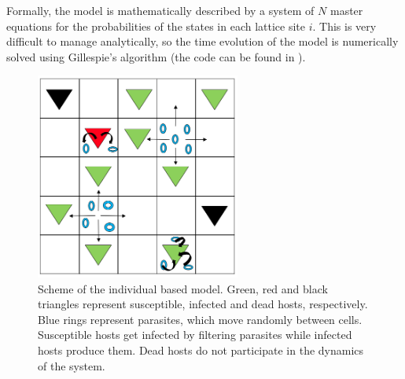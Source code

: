 Formally, the model is mathematically described by a system of $N$ master
equations for the probabilities of the states in each lattice site $i$. This is
very difficult to manage analytically, so the time evolution of the model is
numerically solved using Gillespie's algorithm \cite{Gillespie1977} (the code
can be found in \cite{CODE}).

\begin{figure}[H]
    \centering
    \includegraphics[width=0.6\textwidth]{Figures/IBM.png}
    \caption{Scheme of the individual based model. Green, red and black
        triangles represent susceptible, infected and dead hosts, respectively.
        Blue
        rings represent parasites, which move randomly between cells.
        Susceptible hosts
        get infected by filtering parasites while infected hosts produce them.
        Dead
        hosts do not participate in the dynamics of the system.}
    \label{fig:IBM}
\end{figure}

